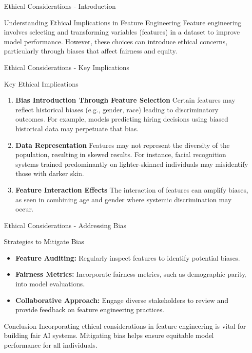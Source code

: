 \documentclass[aspectratio=169]{beamer}
\begin{document}
\begin{frame}[fragile]{Ethical Considerations - Introduction}
    \begin{block}{Understanding Ethical Implications in Feature Engineering}
        Feature engineering involves selecting and transforming variables (features) in a dataset to improve model performance. However, these choices can introduce ethical concerns, particularly through biases that affect fairness and equity.
    \end{block}
\end{frame}

\begin{frame}[fragile]{Ethical Considerations - Key Implications}
    \begin{block}{Key Ethical Implications}
        \begin{enumerate}
            \item \textbf{Bias Introduction Through Feature Selection}  
            Certain features may reflect historical biases (e.g., gender, race) leading to discriminatory outcomes. For example, models predicting hiring decisions using biased historical data may perpetuate that bias.
            
            \item \textbf{Data Representation}  
            Features may not represent the diversity of the population, resulting in skewed results. For instance, facial recognition systems trained predominantly on lighter-skinned individuals may misidentify those with darker skin.
            
            \item \textbf{Feature Interaction Effects}  
            The interaction of features can amplify biases, as seen in combining age and gender where systemic discrimination may occur.
        \end{enumerate}
    \end{block}
\end{frame}

\begin{frame}[fragile]{Ethical Considerations - Addressing Bias}
    \begin{block}{Strategies to Mitigate Bias}
        \begin{itemize}
            \item \textbf{Feature Auditing:} Regularly inspect features to identify potential biases.
            \item \textbf{Fairness Metrics:} Incorporate fairness metrics, such as demographic parity, into model evaluations.
            \item \textbf{Collaborative Approach:} Engage diverse stakeholders to review and provide feedback on feature engineering practices.
        \end{itemize}
    \end{block}

    \begin{block}{Conclusion}
        Incorporating ethical considerations in feature engineering is vital for building fair AI systems. Mitigating bias helps ensure equitable model performance for all individuals.
    \end{block}
\end{frame}
\end{document}
